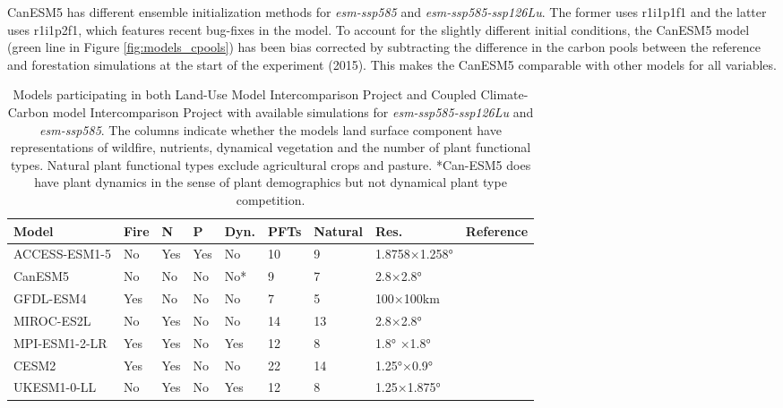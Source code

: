 \documentclass[]{article}
\begin{document}
CanESM5 has different ensemble initialization methods for \textit{esm-ssp585} and \textit{esm-ssp585-ssp126Lu}.
The former uses r1i1p1f1 and the latter uses r1i1p2f1, which features recent bug-fixes in the model.
To account for the slightly different initial conditions, the CanESM5 model (green line in Figure \ref{fig:models_cpools}) has been bias corrected by subtracting the difference in the carbon pools between the reference and forestation simulations at the start of the experiment (2015).
This makes the CanESM5 comparable with other models for all variables.

\begin{table}[H]
    \centering
    \begin{tabular}{lllllllll}
        \hline
Model         & Fire & N   & P   & Dyn.  & PFTs     & Natural & Res.           & Reference                           \\ \hline
ACCESS-ESM1-5 & No   & Yes & Yes & No    & 10       & 9       & 1.8758×1.258°   & \cite{ziehn_australian_2020}   \\
CanESM5       & No   & No  & No  & No*   & 9        & 7       & 2.8×2.8°  & \cite{swart_canadian_2019}     \\
GFDL-ESM4     & Yes  & No  & No  & No    & 7        & 5       & 100×100km       & \cite{dunne_gfdl_2020}         \\
MIROC-ES2L    & No   & Yes & No  & No    & 14       & 13      & 2.8×2.8°        & \cite{hajima_development_2020} \\
MPI-ESM1-2-LR & Yes  & Yes & No  & Yes   & 12       & 8      & 1.8° ×1.8°       & \cite{mauritsen_developments_2019}  \\
CESM2         & Yes  & Yes & No  & No    & 22       & 14      & 1.25°×0.9°      & \cite{danabasoglu_community_2020} \\
UKESM1-0-LL   & No   & Yes & No  & Yes   & 12       & 8       & 1.25×1.875°     & \cite{sellar_ukesm1_2019}      \\ \hline
    \end{tabular}
    \caption{Models participating in both Land-Use Model Intercomparison Project and Coupled Climate-Carbon model Intercomparison Project with available simulations for \textit{esm-ssp585-ssp126Lu} and \textit{esm-ssp585}. The columns indicate whether the models land surface component have representations of wildfire, nutrients, dynamical vegetation and the number of plant functional types. Natural plant functional types exclude agricultural crops and pasture. *Can-ESM5 does have plant dynamics in the sense of plant demographics but not dynamical plant type competition.}
    \label{tab:models}
\end{table}
\end{document}
